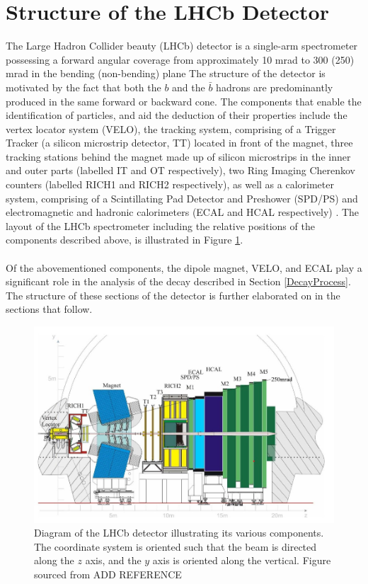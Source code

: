 \section{Structure of the LHCb Detector}
The Large Hadron Collider beauty (LHCb) detector is a single-arm spectrometer possessing a forward angular coverage from
approximately 10 mrad to 300 (250) mrad in the bending (non-bending) plane \cite{https://doi.org/10.48550/arxiv.0910.1740}
The structure of the detector is motivated by the fact that both the $b$ and the $\bar{b}$ hadrons are predominantly produced in the
same forward or backward cone. The components that enable the identification of particles, and aid the deduction of their properties include
the vertex locator system (VELO), the tracking system, comprising of a Trigger Tracker (a silicon microstrip detector, TT) located in front 
of the magnet, three tracking stations behind the magnet made up of silicon microstrips in the inner and outer parts (labelled IT and OT respectively),
two Ring Imaging Cherenkov counters (labelled RICH1 and RICH2 respectively), as well as a calorimeter system, comprising of a Scintillating Pad Detector and Preshower
(SPD/PS) and electromagnetic and hadronic calorimeters (ECAL and HCAL respectively) \cite{https://doi.org/10.48550/arxiv.0910.1740}. The layout of the LHCb spectrometer including the relative positions of the components described above, is illustrated in Figure \ref{LHCbDetector}.\\
\\
Of the abovementioned components, the dipole magnet, VELO, and ECAL play a significant role
in the analysis of the decay described in Section \ref{DecayProcess}. The structure of these sections of the
detector is further elaborated on in the sections that follow.
\begin{figure}[H]
    \centering
    \includegraphics[scale = 0.45]{LHCbDetector.jpg}
    \caption{Diagram of the LHCb detector illustrating its various components. The coordinate system is oriented such that the beam is directed along the $z$ axis, and the $y$ axis is oriented along the vertical. Figure sourced from ADD REFERENCE}
    \label{LHCbDetector}
\end{figure}

